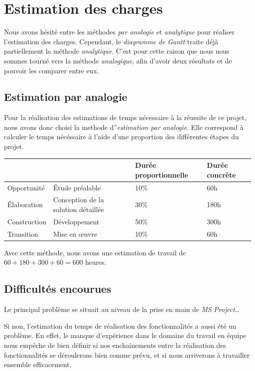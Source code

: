 \documentclass[etudiants]{support-iutrs}
\begin{document}
\header

\section{Estimation des charges} 
Nous avons hésité entre les méthodes \emph{par analogie} et \emph{analytique} pour réaliser l'estimation des charges.
Cependant, le \emph{diagramme de Gantt} traite déjà partiellement la méthode \emph{analytique}. 
C'est pour cette raison que nous nous sommes tourné vers la méthode \emph{analogique}, afin d'avoir deux résultats et de pouvoir les comparer entre eux. 

\subsection{Estimation par analogie}

Pour la réalisation des estimations de temps nécessaire à la réussite de ce projet,
nous avons donc choisi la methode d''\emph{estimation par analogie}.
Elle correspond à calculer le temps nécéssaire à l'aide d'une proportion des différentes étapes du projet. 

\begin{tabular}{|l l|l|l|}
\hline
&& Durée proportionnelle & Durée concrète \\
\hline
Opportunité & Étude préalable & 10\% & 60h \\
\hline
Élaboration & Conception de la solution détaillée & 30\% & 180h \\
\hline
Construction & Développement & 50\% & 300h \\
\hline
Transition & Mise en œuvre & 10\% & 60h \\
\hline
\end{tabular}

Avec cette méthode, nous avons une estimation de travail de $60 + 180 + 300 + 60 = 600$ heures. 


\subsection{Difficultés encourues} 
Le principal problème se situait au niveau de la prise en main de \emph{MS Project}…

Si non, l'estimation du temps de réalisation des fonctionnalités a aussi été un problème. 
En effet, le manque d'expérience dans le domaine du travail en équipe nous empêche de bien définir si nos enchainements entre la réalisation des fonctionnalités se  déroulerons bien comme prévu, et si nous arriverons à travailler ensemble efficacement. 
\end{document}
